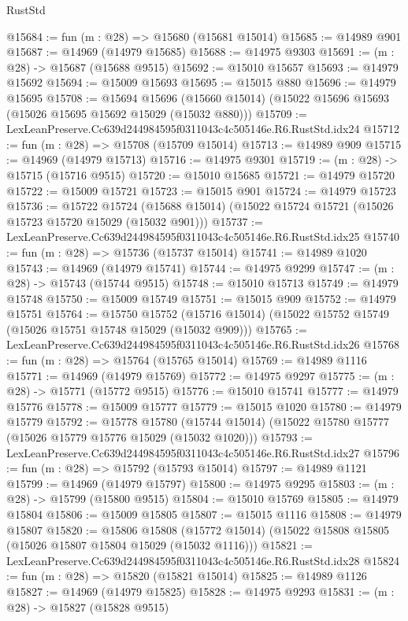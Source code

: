 \begin{lexlean}{RustStd}
\begin{coremodule}
@15684 := fun (m : @28) => @15680 (@15681 @15014)
@15685 := @14989 @901
@15687 := @14969 (@14979 @15685)
@15688 := @14975 @9303
@15691 := (m : @28) -> @15687 (@15688 @9515)
@15692 := @15010 @15657
@15693 := @14979 @15692
@15694 := @15009 @15693
@15695 := @15015 @880
@15696 := @14979 @15695
@15708 := @15694
    @15696
    (@15660 @15014)
    (@15022 @15696 @15693 (@15026 @15695 @15692 @15029 (@15032 @880)))
@15709 := LexLeanPreserve.Cc639d244984595f0311043c4c505146e.R6.RustStd.idx24
@15712 := fun (m : @28) => @15708 (@15709 @15014)
@15713 := @14989 @909
@15715 := @14969 (@14979 @15713)
@15716 := @14975 @9301
@15719 := (m : @28) -> @15715 (@15716 @9515)
@15720 := @15010 @15685
@15721 := @14979 @15720
@15722 := @15009 @15721
@15723 := @15015 @901
@15724 := @14979 @15723
@15736 := @15722
    @15724
    (@15688 @15014)
    (@15022 @15724 @15721 (@15026 @15723 @15720 @15029 (@15032 @901)))
@15737 := LexLeanPreserve.Cc639d244984595f0311043c4c505146e.R6.RustStd.idx25
@15740 := fun (m : @28) => @15736 (@15737 @15014)
@15741 := @14989 @1020
@15743 := @14969 (@14979 @15741)
@15744 := @14975 @9299
@15747 := (m : @28) -> @15743 (@15744 @9515)
@15748 := @15010 @15713
@15749 := @14979 @15748
@15750 := @15009 @15749
@15751 := @15015 @909
@15752 := @14979 @15751
@15764 := @15750
    @15752
    (@15716 @15014)
    (@15022 @15752 @15749 (@15026 @15751 @15748 @15029 (@15032 @909)))
@15765 := LexLeanPreserve.Cc639d244984595f0311043c4c505146e.R6.RustStd.idx26
@15768 := fun (m : @28) => @15764 (@15765 @15014)
@15769 := @14989 @1116
@15771 := @14969 (@14979 @15769)
@15772 := @14975 @9297
@15775 := (m : @28) -> @15771 (@15772 @9515)
@15776 := @15010 @15741
@15777 := @14979 @15776
@15778 := @15009 @15777
@15779 := @15015 @1020
@15780 := @14979 @15779
@15792 := @15778
    @15780
    (@15744 @15014)
    (@15022 @15780 @15777 (@15026 @15779 @15776 @15029 (@15032 @1020)))
@15793 := LexLeanPreserve.Cc639d244984595f0311043c4c505146e.R6.RustStd.idx27
@15796 := fun (m : @28) => @15792 (@15793 @15014)
@15797 := @14989 @1121
@15799 := @14969 (@14979 @15797)
@15800 := @14975 @9295
@15803 := (m : @28) -> @15799 (@15800 @9515)
@15804 := @15010 @15769
@15805 := @14979 @15804
@15806 := @15009 @15805
@15807 := @15015 @1116
@15808 := @14979 @15807
@15820 := @15806
    @15808
    (@15772 @15014)
    (@15022 @15808 @15805 (@15026 @15807 @15804 @15029 (@15032 @1116)))
@15821 := LexLeanPreserve.Cc639d244984595f0311043c4c505146e.R6.RustStd.idx28
@15824 := fun (m : @28) => @15820 (@15821 @15014)
@15825 := @14989 @1126
@15827 := @14969 (@14979 @15825)
@15828 := @14975 @9293
@15831 := (m : @28) -> @15827 (@15828 @9515)

\end{coremodule}
\end{lexlean}
